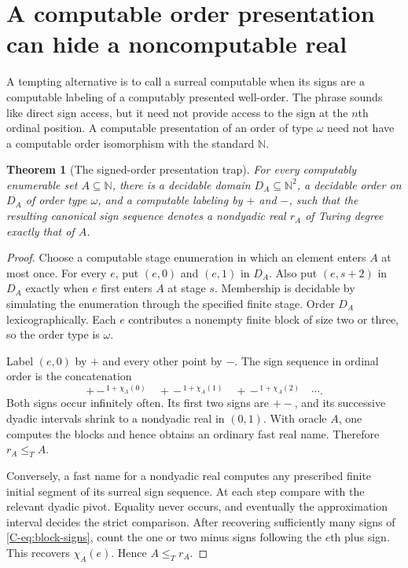 \documentclass[11pt,letterpaper]{article}
\numberwithin{equation}{section}
\newtheorem{theorem}{Theorem}[section]
\theoremstyle{definition}
\theoremstyle{remark}
\newcommand{\N}{\mathbb N}
\begin{document}
\section{A computable order presentation can hide a noncomputable real}
\label{sec:signtrap}

A tempting alternative is to call a surreal computable when its signs are a
computable labeling of a computably presented well-order. The phrase sounds
like direct sign access, but it need not provide access to the sign at the
$n$th ordinal position. A computable presentation of an order of type
$\omega$ need not have a computable order isomorphism with the standard
$\N$.

\begin{theorem}[The signed-order presentation trap]
\label{thm:signtrap}
For every computably enumerable set $A\subseteq\N$, there is a decidable
domain $D_A\subseteq\N^2$, a decidable order on $D_A$ of order type
$\omega$, and a computable labeling by $+$ and $-$, such that the resulting
canonical sign sequence denotes a nondyadic real $r_A$ of Turing degree
exactly that of $A$.
\end{theorem}
\begin{proof}
Choose a computable stage enumeration in which an element enters $A$ at
most once. For every $e$, put $(e,0)$ and $(e,1)$ in $D_A$. Also put
$(e,s+2)$ in $D_A$ exactly when $e$ first enters $A$ at stage $s$.
Membership is decidable by simulating the enumeration through the specified
finite stage. Order $D_A$ lexicographically. Each $e$ contributes a nonempty
finite block of size two or three, so the order type is $\omega$.

Label $(e,0)$ by $+$ and every other point by $-$. The sign sequence in
ordinal order is the concatenation
\begin{equation}
 +\,-^{\,1+\chi_A(0)}\quad
 +\,-^{\,1+\chi_A(1)}\quad
 +\,-^{\,1+\chi_A(2)}\quad\cdots.
 \label{C-eq:block-signs}
\end{equation}
Both signs occur infinitely often. Its first two signs are $+-$, and its
successive dyadic intervals shrink to a nondyadic real in $(0,1)$.
With oracle $A$, one computes the blocks and hence obtains an ordinary fast
real name. Therefore $r_A\leq_T A$.

Conversely, a fast name for a nondyadic real computes any prescribed finite
initial segment of its surreal sign sequence. At each step compare with the
relevant dyadic pivot. Equality never occurs, and eventually the approximation
interval decides the strict comparison. After recovering sufficiently many
signs of \eqref{C-eq:block-signs}, count the one or two minus signs following
the $e$th plus sign. This recovers $\chi_A(e)$. Hence $A\leq_T r_A$.
\end{proof}
\end{document}
